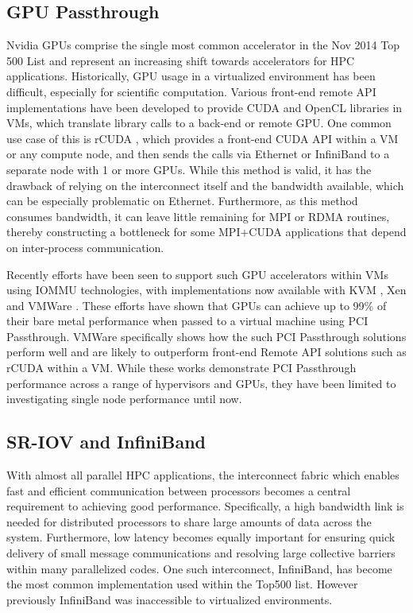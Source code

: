\subsection{GPU Passthrough}

Nvidia GPUs comprise the single most common accelerator in the Nov 2014 Top 500 List \cite{www-top500} and represent an increasing shift towards accelerators for HPC applications. Historically, GPU usage in a virtualized environment has been difficult, especially for scientific computation. Various front-end remote API implementations have been developed to provide CUDA and OpenCL libraries in VMs, which translate library calls to a back-end or remote GPU. One common use case of this is rCUDA \cite{duato2011enabling}, which provides a front-end CUDA API within a VM or any compute node, and then sends the calls via Ethernet or InfiniBand to a separate node with 1 or more GPUs. While this method is valid, it has the drawback of relying on the interconnect itself and the bandwidth available, which can be especially problematic on Ethernet. Furthermore, as this method consumes bandwidth, it can leave little remaining for MPI or RDMA routines, thereby constructing a bottleneck for some MPI+CUDA applications that depend on inter-process communication.

Recently efforts have been seen to support such GPU accelerators within VMs using IOMMU technologies, with implementations now available with KVM \cite{Walters2014cloud}, Xen \cite{Younge2014hpgc} and VMWare \cite{Vu2014}.  These efforts have shown that GPUs can achieve up to 99\% of their bare metal performance when passed to a virtual machine using PCI Passthrough.  VMWare specifically shows how the such PCI Passthrough solutions perform well and are likely to outperform front-end Remote API solutions such as rCUDA within a VM\cite{Vu2014}.  While these works demonstrate PCI Passthrough performance across a range of hypervisors and GPUs, they have been limited to investigating single node performance until now. 

\subsection{SR-IOV and InfiniBand}

With almost all parallel HPC applications, the interconnect fabric which enables fast and efficient communication between processors becomes a central requirement to achieving good performance. Specifically, a high bandwidth link is needed for distributed processors to share large amounts of data across the system. Furthermore, low latency becomes equally important for ensuring quick delivery of small message communications and resolving large collective barriers within many parallelized codes. One such interconnect, InfiniBand, has become the most common implementation used within the Top500 list. However previously InfiniBand was inaccessible to virtualized environments.  

